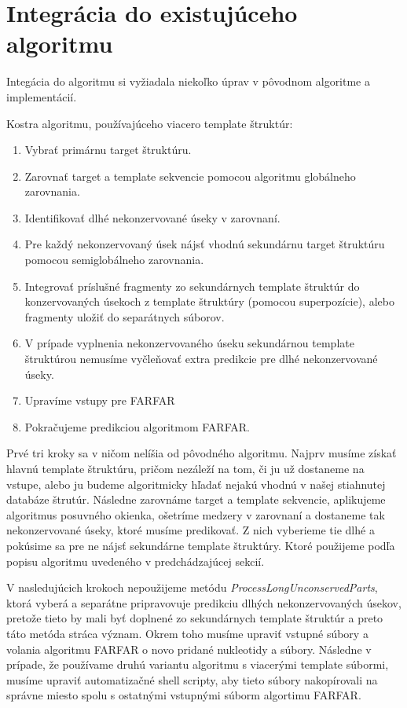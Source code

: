 \section{Integrácia do existujúceho algoritmu}
Integácia do algoritmu si vyžiadala niekoľko úprav v pôvodnom algoritme a implementácií.

\indent Kostra algoritmu, používajúceho viacero template štruktúr:
\begin{enumerate}
\item Vybrať primárnu target štruktúru.
\item Zarovnať  target a template sekvencie pomocou algoritmu globálneho zarovnania.
\item Identifikovať dlhé nekonzervované úseky v zarovnaní.
\item Pre každý nekonzervovaný úsek nájsť vhodnú sekundárnu target štruktúru pomocou semiglobálneho zarovnania.
\item Integrovať príslušné fragmenty zo sekundárnych template štruktúr do konzervovaných úsekoch z template štruktúry (pomocou superpozície), alebo fragmenty uložiť do separátnych súborov.
\item V prípade vyplnenia nekonzervovaného úseku sekundárnou template štruktúrou nemusíme vyčleňovať extra predikcie pre dlhé nekonzervované úseky.
\item Upravíme vstupy pre FARFAR
\item Pokračujeme predikciou algoritmom FARFAR.
\end{enumerate}


\indent Prvé tri kroky sa v ničom nelíšia od pôvodného algoritmu. Najprv musíme získať hlavnú template štruktúru, pričom nezáleží na tom, či ju už dostaneme na vstupe, alebo ju budeme algoritmicky hľadať  nejakú vhodnú v našej stiahnutej databáze štrutúr. Následne zarovnáme target a template sekvencie, aplikujeme algoritmus posuvného okienka, ošetríme medzery v zarovnaní a dostaneme tak nekonzervované úseky, ktoré musíme predikovať. Z nich vyberieme tie dlhé a pokúsime sa pre ne nájsť sekundárne template štruktúry. Ktoré použijeme podľa popisu algoritmu uvedeného v predchádzajúcej sekcií.


\indent V nasledujúcich krokoch nepoužijeme metódu \textit{ProcessLongUnconservedParts}, ktorá vyberá a separátne pripravovuje predikciu dlhých nekonzervovaných úsekov, pretože tieto by mali byť doplnené zo sekundárnych template štruktúr a preto táto metóda stráca význam. Okrem toho musíme upraviť vstupné súbory a volania algoritmu FARFAR o novo pridané nukleotidy a súbory. Následne v prípade, že používame druhú variantu algoritmu s viacerými template súbormi, musíme upraviť automatizačné shell scripty, aby tieto súbory nakopírovali na správne miesto spolu s ostatnými vstupnými súborm algortimu FARFAR.


